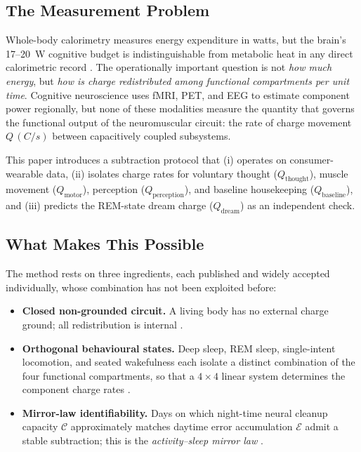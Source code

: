 \documentclass[11pt,twocolumn,a4paper]{article}
\theoremstyle{definition}
\theoremstyle{remark}
\newcommand{\Qth}{Q_{\mathrm{thought}}}
\newcommand{\Qmo}{Q_{\mathrm{motor}}}
\newcommand{\Qpe}{Q_{\mathrm{perception}}}
\newcommand{\Qba}{Q_{\mathrm{baseline}}}
\newcommand{\Qdr}{Q_{\mathrm{dream}}}
\begin{document}
\subsection{The Measurement Problem}

Whole-body calorimetry measures energy expenditure in watts, but the
brain's 17--20~W cognitive budget is indistinguishable from metabolic
heat in any direct calorimetric record \citep{mifflin1990,harris1919}.
The operationally important question is not \emph{how much energy},
but \emph{how is charge redistributed among functional compartments
per unit time}. Cognitive neuroscience uses fMRI, PET, and EEG to
estimate component power regionally, but none of these modalities
measure the quantity that governs the functional output of the
neuromuscular circuit: the rate of charge movement $Q\,(C/s)$ between
capacitively coupled subsystems.

This paper introduces a subtraction protocol that (i) operates on
consumer-wearable data, (ii) isolates charge rates for voluntary
thought ($\Qth$), muscle movement ($\Qmo$), perception ($\Qpe$), and
baseline housekeeping ($\Qba$), and (iii) predicts the REM-state
dream charge ($\Qdr$) as an independent check.

\subsection{What Makes This Possible}

The method rests on three ingredients, each published and widely
accepted individually, whose combination has not been exploited
before:

\begin{itemize}
  \item \textbf{Closed non-grounded circuit.} A living body has no
  external charge ground; all redistribution is internal
  \citep{hodgkin1952,kirchhoff1845}.
  \item \textbf{Orthogonal behavioural states.} Deep sleep, REM sleep,
  single-intent locomotion, and seated wakefulness each isolate a
  distinct combination of the four functional compartments, so that
  a $4\times4$ linear system determines the component charge rates
  \citep{maquet1990,braun1997,jung2011}.
  \item \textbf{Mirror-law identifiability.} Days on which night-time
  neural cleanup capacity $\mathcal{C}$ approximately matches daytime
  error accumulation $\mathcal{E}$ admit a stable subtraction; this
  is the \emph{activity--sleep mirror law}
  \citep{xie2013,hablitz2020,benveniste2019}.
\end{itemize}
\end{document}

